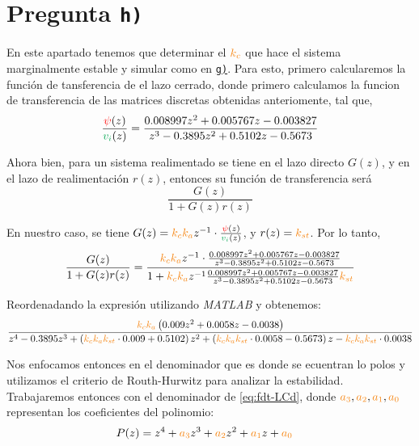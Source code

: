 \section{Pregunta \texttt{h)}}\label{pregunta-h}


En este apartado tenemos que determinar el $\nara{k_c}$  que hace el sistema
marginalmente estable y simular como en \hyperref[pregunta-g]{\texttt{g)}}. Para
esto, primero calcularemos la función de tansferencia de el lazo cerrado, donde
primero calculamos la funcion de transferencia de las matrices discretas obtenidas
anteriomente, tal que,
\begin{equation}
   \frac{\rojo{\psi}(z)}{\verd{v_{i}}(z)} = \frac{0.008997z^2 + 0.005767 z - 0.003827}
    {z^3 - 0.3895 z^2 + 0.5102 z -0.5673}
\end{equation}

Ahora bien, para un sistema realimentado se tiene en el lazo directo $G(z)$, y 
en el lazo de realimentación $r(z)$, entonces su función de transferencia será
\begin{equation}
    \frac{G(z)}{1 + G(z)r(z)}
\end{equation}

En nuestro caso, se tiene $G(z) = \nara{k_{c} k_{a}} z^{-1} \cdot \frac{\rojo{\psi}(z)}{\verd{v_i}(z)}$,
y $r(z) = \nara{k_{st}}$. Por lo tanto,
\begin{equation}
    \frac{G(z)}{1 + G(z)r(z)} = \dfrac{\nara{k_ck_a} z^{-1} \cdot\frac{0.008997z^2 + 0.005767 z - 0.003827}
    {z^3 - 0.3895 z^2 + 0.5102 z -0.5673}}
    {1+\nara{k_ck_a} z^{-1} \frac{0.008997z^2 + 0.005767 z - 0.003827}
    {z^3 - 0.3895 z^2 + 0.5102 z -0.5673}\nara{k_{st}}}
\end{equation}

Reordenadando la expresión utilizando \textit{MATLAB} y obtenemos:
\begin{equation}\label{eq:fdt-LCd}
        \frac{ \nara{k_c k_a} \left( 0.009 z^2 + 0.0058 z - 0.0038 \right)}
        { z^4 -0.3895z^3 + \left( \nara{k_c k_a k_{st}} \cdot 0.009 + 0.5102
        \right) z^2 
        + \left( \nara{k_c k_a k_{st}} \cdot0.0058 -0.5673 \right) z 
        - \nara{k_c k_a k_{st}} \cdot 0.0038 }
\end{equation}

Nos enfocamos entonces en el denominador que es donde se ecuentran lo polos y
utilizamos el criterio de Routh-Hurwitz para analizar la estabilidad. 
Trabajaremos entonces con el denominador de \eqref{eq:fdt-LCd}, donde $\nara{a_3},\nara{a_2},\nara{a_1},\nara{a_0}$
representan los coeficientes del polinomio:
\begin{align}
    P(z) = z^4 +\nara{a_3}z^3 + \nara{a_2} z^2 + \nara{a_1} z + \nara{a_0} &
\end{align}

